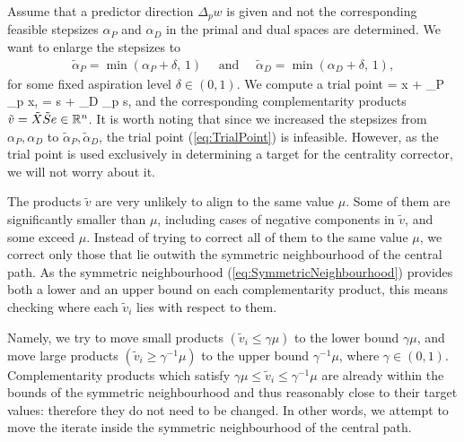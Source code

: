 Assume that a predictor direction $\Delta_p w$ is given 
and not the corresponding
feasible stepsizes $\alpha_{P}$ and $\alpha_{D}$ 
in the primal and dual spaces are determined. 
We want to enlarge the stepsizes to 
%
\begin{eqnarray*} 
   \tilde{\alpha}_{P} = \min(\alpha_{P} \! + \! \delta, \,1) 
   \quad \mbox{ and } \quad
   \tilde{\alpha}_{D} = \min(\alpha_{D} \! + \! \delta, \,1), 
\end{eqnarray*}
%
for some fixed aspiration level $\delta \in(0,1)$. We compute a trial point
%
\be  \label{eq:TrialPoint}
   = x + \tilde{\alpha}_{P} \Delta_{p} x, \quad 
   = s + \tilde{\alpha}_{D} \Delta_{p} s,
\ee
%
and the corresponding complementarity products 
$\tilde v = \tilde X \tilde S e \in \mathbb{R}^{n}$.
It is worth noting that since we increased the stepsizes from 
$\alpha_P,\alpha_D$ to $\tilde \alpha_P,\tilde \alpha_D$,
the trial point (\ref{eq:TrialPoint}) is infeasible.
However, as the trial point is used exclusively in
determining a target for the centrality corrector, we will not
worry about it.

The products $\tilde v$ are very unlikely to align to the same value $\mu$.
Some of them are significantly smaller than $\mu$, 
including cases of negative components in $\tilde v$, 
and some exceed $\mu$. Instead of trying to correct 
all of them to the same value $\mu$, we correct only those that
lie outwith the symmetric neighbourhood of the central path.
As the symmetric neighbourhood (\ref{eq:SymmetricNeighbourhood})
provides both a lower and an upper bound on each complementarity product,
this means checking where each $\tilde v_i$ lies with respect to
them.

Namely, we try to move small products 
$(\tilde v_i \leq \gamma \mu)$ to the lower bound $\gamma \mu$, and move 
large products $(\tilde v_i \geq \gamma^{-1} \mu)$ 
to the upper bound $\gamma^{-1} \mu$, where $\gamma \in (0,1)$.
Complementarity products 
which satisfy $\gamma \mu \leq \tilde v_i \leq \gamma^{-1} \mu$ are
already within the bounds of the symmetric neighbourhood and thus
reasonably close to their target values: therefore they
do not need to be changed. 
In other words, we attempt to move the iterate inside the symmetric
neighbourhood of the central path.

